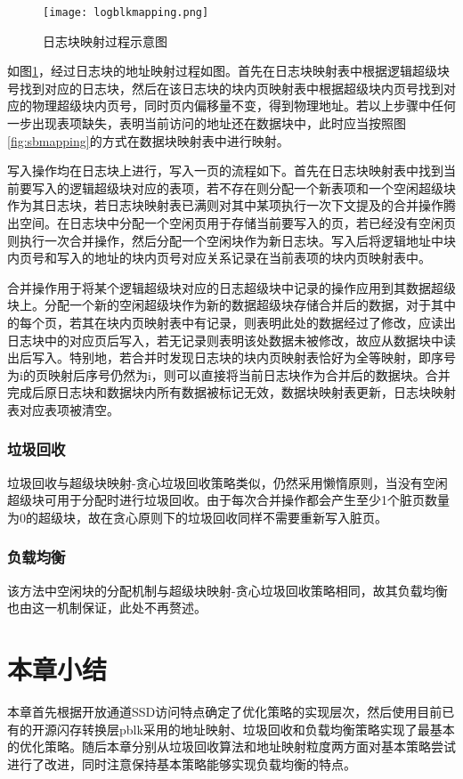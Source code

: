 \begin{figure}[H]
    \centering
    \texttt{[image: logblkmapping.png]}
    \caption{日志块映射过程示意图}
    \label{fig:logblkmapping}
\end{figure}

如图\ref{fig:logblkmapping}，经过日志块的地址映射过程如图。首先在日志块映射表中根据逻辑超级块号找到对应的日志块，然后在该日志块的块内页映射表中根据超级块内页号找到对应的物理超级块内页号，同时页内偏移量不变，得到物理地址。若以上步骤中任何一步出现表项缺失，表明当前访问的地址还在数据块中，此时应当按照图\ref{fig:sbmapping}的方式在数据块映射表中进行映射。

写入操作均在日志块上进行，写入一页的流程如下。首先在日志块映射表中找到当前要写入的逻辑超级块对应的表项，若不存在则分配一个新表项和一个空闲超级块作为其日志块，若日志块映射表已满则对其中某项执行一次下文提及的合并操作腾出空间。在日志块中分配一个空闲页用于存储当前要写入的页，若已经没有空闲页则执行一次合并操作，然后分配一个空闲块作为新日志块。写入后将逻辑地址中块内页号和写入的地址的块内页号对应关系记录在当前表项的块内页映射表中。

合并操作用于将某个逻辑超级块对应的日志超级块中记录的操作应用到其数据超级块上。分配一个新的空闲超级块作为新的数据超级块存储合并后的数据，对于其中的每个页，若其在块内页映射表中有记录，则表明此处的数据经过了修改，应读出日志块中的对应页后写入，若无记录则表明该处数据未被修改，故应从数据块中读出后写入。特别地，若合并时发现日志块的块内页映射表恰好为全等映射，即序号为i的页映射后序号仍然为i，则可以直接将当前日志块作为合并后的数据块。合并完成后原日志块和数据块内所有数据被标记无效，数据块映射表更新，日志块映射表对应表项被清空。

\subsubsection{垃圾回收}
垃圾回收与超级块映射-贪心垃圾回收策略类似，仍然采用懒惰原则，当没有空闲超级块可用于分配时进行垃圾回收。由于每次合并操作都会产生至少1个脏页数量为0的超级块，故在贪心原则下的垃圾回收同样不需要重新写入脏页。

\subsubsection{负载均衡}
该方法中空闲块的分配机制与超级块映射-贪心垃圾回收策略相同，故其负载均衡也由这一机制保证，此处不再赘述。

\section{本章小结}
本章首先根据开放通道SSD访问特点确定了优化策略的实现层次，然后使用目前已有的开源闪存转换层pblk采用的地址映射、垃圾回收和负载均衡策略实现了最基本的优化策略。随后本章分别从垃圾回收算法和地址映射粒度两方面对基本策略尝试进行了改进，同时注意保持基本策略能够实现负载均衡的特点。